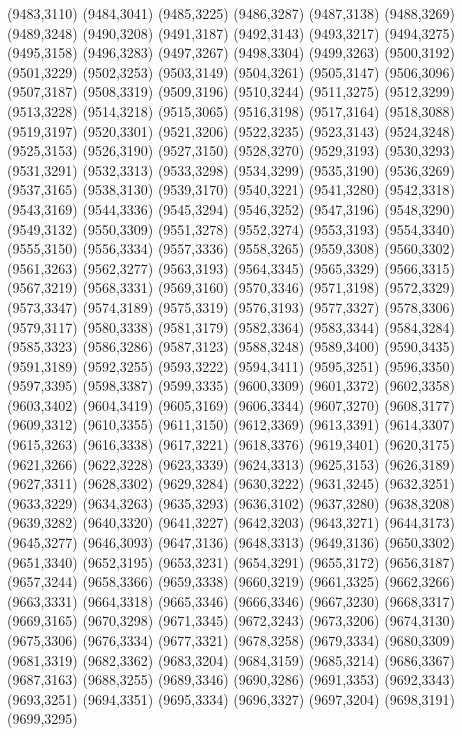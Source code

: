 (9483,3110)
(9484,3041)
(9485,3225)
(9486,3287)
(9487,3138)
(9488,3269)
(9489,3248)
(9490,3208)
(9491,3187)
(9492,3143)
(9493,3217)
(9494,3275)
(9495,3158)
(9496,3283)
(9497,3267)
(9498,3304)
(9499,3263)
(9500,3192)
(9501,3229)
(9502,3253)
(9503,3149)
(9504,3261)
(9505,3147)
(9506,3096)
(9507,3187)
(9508,3319)
(9509,3196)
(9510,3244)
(9511,3275)
(9512,3299)
(9513,3228)
(9514,3218)
(9515,3065)
(9516,3198)
(9517,3164)
(9518,3088)
(9519,3197)
(9520,3301)
(9521,3206)
(9522,3235)
(9523,3143)
(9524,3248)
(9525,3153)
(9526,3190)
(9527,3150)
(9528,3270)
(9529,3193)
(9530,3293)
(9531,3291)
(9532,3313)
(9533,3298)
(9534,3299)
(9535,3190)
(9536,3269)
(9537,3165)
(9538,3130)
(9539,3170)
(9540,3221)
(9541,3280)
(9542,3318)
(9543,3169)
(9544,3336)
(9545,3294)
(9546,3252)
(9547,3196)
(9548,3290)
(9549,3132)
(9550,3309)
(9551,3278)
(9552,3274)
(9553,3193)
(9554,3340)
(9555,3150)
(9556,3334)
(9557,3336)
(9558,3265)
(9559,3308)
(9560,3302)
(9561,3263)
(9562,3277)
(9563,3193)
(9564,3345)
(9565,3329)
(9566,3315)
(9567,3219)
(9568,3331)
(9569,3160)
(9570,3346)
(9571,3198)
(9572,3329)
(9573,3347)
(9574,3189)
(9575,3319)
(9576,3193)
(9577,3327)
(9578,3306)
(9579,3117)
(9580,3338)
(9581,3179)
(9582,3364)
(9583,3344)
(9584,3284)
(9585,3323)
(9586,3286)
(9587,3123)
(9588,3248)
(9589,3400)
(9590,3435)
(9591,3189)
(9592,3255)
(9593,3222)
(9594,3411)
(9595,3251)
(9596,3350)
(9597,3395)
(9598,3387)
(9599,3335)
(9600,3309)
(9601,3372)
(9602,3358)
(9603,3402)
(9604,3419)
(9605,3169)
(9606,3344)
(9607,3270)
(9608,3177)
(9609,3312)
(9610,3355)
(9611,3150)
(9612,3369)
(9613,3391)
(9614,3307)
(9615,3263)
(9616,3338)
(9617,3221)
(9618,3376)
(9619,3401)
(9620,3175)
(9621,3266)
(9622,3228)
(9623,3339)
(9624,3313)
(9625,3153)
(9626,3189)
(9627,3311)
(9628,3302)
(9629,3284)
(9630,3222)
(9631,3245)
(9632,3251)
(9633,3229)
(9634,3263)
(9635,3293)
(9636,3102)
(9637,3280)
(9638,3208)
(9639,3282)
(9640,3320)
(9641,3227)
(9642,3203)
(9643,3271)
(9644,3173)
(9645,3277)
(9646,3093)
(9647,3136)
(9648,3313)
(9649,3136)
(9650,3302)
(9651,3340)
(9652,3195)
(9653,3231)
(9654,3291)
(9655,3172)
(9656,3187)
(9657,3244)
(9658,3366)
(9659,3338)
(9660,3219)
(9661,3325)
(9662,3266)
(9663,3331)
(9664,3318)
(9665,3346)
(9666,3346)
(9667,3230)
(9668,3317)
(9669,3165)
(9670,3298)
(9671,3345)
(9672,3243)
(9673,3206)
(9674,3130)
(9675,3306)
(9676,3334)
(9677,3321)
(9678,3258)
(9679,3334)
(9680,3309)
(9681,3319)
(9682,3362)
(9683,3204)
(9684,3159)
(9685,3214)
(9686,3367)
(9687,3163)
(9688,3255)
(9689,3346)
(9690,3286)
(9691,3353)
(9692,3343)
(9693,3251)
(9694,3351)
(9695,3334)
(9696,3327)
(9697,3204)
(9698,3191)
(9699,3295)
